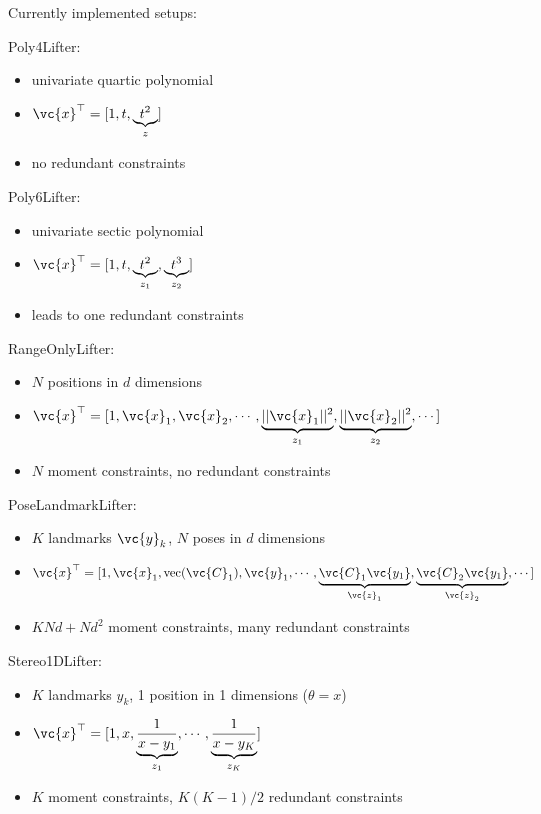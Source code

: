Currently implemented setups:

Poly4Lifter:

\begin{itemize}
\tightlist
\item univariate quartic polynomial
\item \(\vc{x}^\top = [1, t, \underbrace{t^2}_{z}]\)
\item no redundant constraints
\end{itemize}

Poly6Lifter:
\begin{itemize}
\tightlist
\item univariate sectic polynomial
\item \(\vc{x}^\top = [1, t, \underbrace{t^2}_{z_1}, \underbrace{t^3}_{z_2}]\)
\item leads to one redundant constraints
\end{itemize}

RangeOnlyLifter:

\begin{itemize}
\tightlist
\item \(N\) positions in \(d\) dimensions
\item \(\vc{x}^\top = [1, \vc{x}_1, \vc{x}_2, \cdots , \underbrace{||\vc{x}_1||^2}_{z_1}, \underbrace{||\vc{x}_2||^2}_{z_2}, \cdots]\)
\item \(N\) moment constraints, no redundant constraints
\end{itemize}

PoseLandmarkLifter:

\begin{itemize}
\tightlist
\item \(K\) landmarks \(\vc{y}_k\), \(N\) poses in \(d\) dimensions
\item \(\vc{x}^\top = [1, \vc{x}_1, \text{vec}(\vc{C}_1), \vc{y}_1, \cdots , \underbrace{\vc{C}_1\vc{y_1}}_{\vc{z}_1}, \underbrace{\vc{C}_2\vc{y_1}}_{\vc{z}_2}, \cdots]\)
\item \(KNd + Nd^2\) moment constraints, many redundant constraints
\end{itemize}

Stereo1DLifter:

\begin{itemize}
\tightlist
\item \(K\) landmarks \(y_k\), 1 position in 1 dimensions (\(\theta=x\))
\item \(\vc{x}^\top = [1, x, \underbrace{\frac{1}{x-y_1}}_{z_1}, \cdots, \underbrace{\frac{1}{x-y_K}}_{z_K}]\) 
\item \(K\) moment constraints, \(K(K-1)/2\) redundant constraints
\end{itemize}

